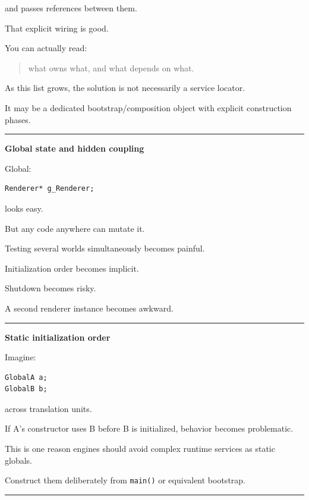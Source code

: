and passes references between them.

That explicit wiring is good.

You can actually read:

\begin{quote}
what owns what, and what depends on what.
\end{quote}

As this list grows, the solution is not necessarily a service locator.

It may be a dedicated bootstrap/composition object with explicit construction phases.

\begin{center}\rule{0.5\linewidth}{0.5pt}\end{center}

\textbf{Global state and hidden coupling}

Global:

\begin{verbatim}
Renderer* g_Renderer;
\end{verbatim}

looks easy.

But any code anywhere can mutate it.

Testing several worlds simultaneously becomes painful.

Initialization order becomes implicit.

Shutdown becomes risky.

A second renderer instance becomes awkward.

\begin{center}\rule{0.5\linewidth}{0.5pt}\end{center}

\textbf{Static initialization order}

Imagine:

\begin{verbatim}
GlobalA a;
GlobalB b;
\end{verbatim}

across translation units.

If A's constructor uses B before B is initialized, behavior becomes problematic.

This is one reason engines should avoid complex runtime services as static globals.

Construct them deliberately from \texttt{main()} or equivalent bootstrap.

\begin{center}\rule{0.5\linewidth}{0.5pt}\end{center}

